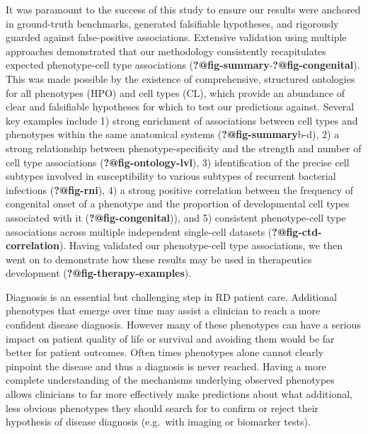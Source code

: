 \documentclass[
]{report}
\begin{document}
It was paramount to the success of this study to ensure our results were
anchored in ground-truth benchmarks, generated falsifiable hypotheses,
and rigorously guarded against false-positive associations. Extensive
validation using multiple approaches demonstrated that our methodology
consistently recapitulates expected phenotype-cell type associations
(\textbf{?@fig-summary}-\textbf{?@fig-congenital}). This was made
possible by the existence of comprehensive, structured ontologies for
all phenotypes (HPO) and cell types (CL), which provide an abundance of
clear and falsifiable hypotheses for which to test our predictions
against. Several key examples include 1) strong enrichment of
associations between cell types and phenotypes within the same
anatomical systems (\textbf{?@fig-summary}b-d), 2) a strong relationship
between phenotype-specificity and the strength and number of cell type
associations (\textbf{?@fig-ontology-lvl}), 3) identification of the
precise cell subtypes involved in susceptibility to various subtypes of
recurrent bacterial infections (\textbf{?@fig-rni}), 4) a strong
positive correlation between the frequency of congenital onset of a
phenotype and the proportion of developmental cell types associated with
it (\textbf{?@fig-congenital})), and 5) consistent phenotype-cell type
associations across multiple independent single-cell datasets
(\textbf{?@fig-ctd-correlation}). Having validated our phenotype-cell
type associations, we then went on to demonstrate how these results may
be used in therapeutics development (\textbf{?@fig-therapy-examples}).

Diagnosis is an essential but challenging step in RD patient care.
Additional phenotypes that emerge over time may assist a clinician to
reach a more confident disease diagnosis. However many of these
phenotypes can have a serious impact on patient quality of life or
survival and avoiding them would be far better for patient outcomes.
Often times phenotypes alone cannot clearly pinpoint the disease and
thus a diagnosis is never reached. Having a more complete understanding
of the mechanisms underlying observed phenotypes allows clinicians to
far more effectively make predictions about what additional, less
obvious phenotypes they should search for to confirm or reject their
hypothesis of disease diagnosis (e.g.~with imaging or biomarker tests).
\end{document}
